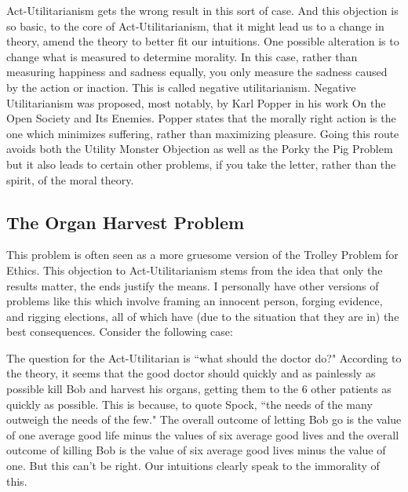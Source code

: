 Act-Utilitarianism gets the wrong result in this sort of case. And this objection is so basic, to the core of Act-Utilitarianism, that it might lead us to a change in theory, amend the theory to better fit our intuitions. One possible alteration is to change what is measured to determine morality. In this case, rather than measuring happiness and sadness equally, you only measure the sadness caused by the action or inaction. This is called negative utilitarianism. Negative Utilitarianism was proposed, most notably, by Karl Popper in his work On the Open Society and Its Enemies. Popper states that the morally right action is the one which minimizes suffering, rather than maximizing pleasure. Going this route avoids both the Utility Monster Objection as well as the Porky the Pig Problem but it also leads to certain other problems, if you take the letter, rather than the spirit, of the moral theory.  

\subsection{The Organ Harvest Problem}

This problem is often seen as a more gruesome version of the Trolley Problem for Ethics. This objection to Act-Utilitarianism stems from the idea that only the results matter, the ends justify the means. I personally have other versions of problems like this which involve framing an innocent person, forging evidence, and rigging elections, all of which have (due to the situation that they are in) the best consequences. Consider the following case:


The question for the Act-Utilitarian is ``what should the doctor do?" According to the theory, it seems that the good doctor should quickly and as painlessly as possible kill Bob and harvest his organs, getting them to the 6 other patients as quickly as possible. This is because, to quote Spock, ``the needs of the many outweigh the needs of the few." The overall outcome of letting Bob go is the value of one average good life minus the values of six average good lives and the overall outcome of killing Bob is the value of six average good lives minus the value of one. But this can't be right. Our intuitions clearly speak to the immorality of this. 

